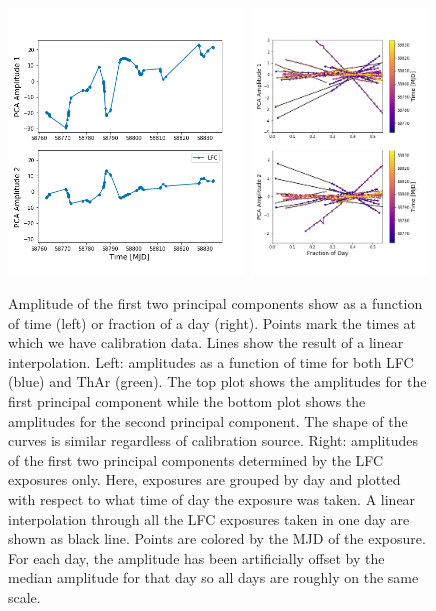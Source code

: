 \documentclass[twocolumn]{aastex63}
\begin{document}
\begin{figure}[h!]
\centering
\includegraphics[width=0.56\textwidth]{Figures/pcA_lfc.png}
\includegraphics[width=0.42\textwidth]{Figures/pcAs_byDay.png}
\caption{Amplitude of the first two principal components show as a function of time (left) or fraction of a day (right).  Points mark the times at which we have calibration data.  Lines show the result of a linear interpolation.  Left: amplitudes as a function of time for both LFC (blue) and ThAr (green).  The top plot shows the amplitudes for the first principal component while the bottom plot shows the amplitudes for the second principal component.  The shape of the curves is similar regardless of calibration source.
Right: amplitudes of the first two principal components determined by the LFC exposures only.  Here, exposures are grouped by day and plotted with respect to what time of day the exposure was taken.  A linear interpolation through all the LFC exposures taken in one day are shown as black line.  Points are colored by the MJD of the exposure.  For each day, the amplitude has been artificially offset by the median amplitude for that day so all days are roughly on the same scale.}
\label{fig:nightlyVariation}
\end{figure} 
\end{document}
